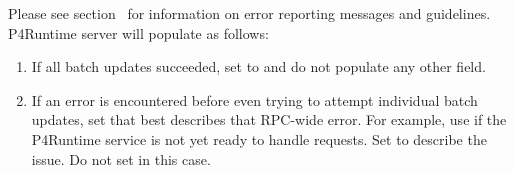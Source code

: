 \documentclass[11pt]{article}
\begin{document}
{%
\noindent{}Please see section~ for
information on error reporting messages and guidelines. P4Runtime server will
populate  as follows:%

\begin{enumerate}%

\item{}
If all batch updates succeeded, set  to  and do not
populate any other field.%

\item{}
If an error is encountered before even trying to attempt individual batch
updates, set  that best describes that RPC-wide
error. For example, use  if the P4Runtime service is not yet
ready to handle requests. Set  to describe the issue. Do not
set  in this case.%


\end{enumerate}}
\end{document}
